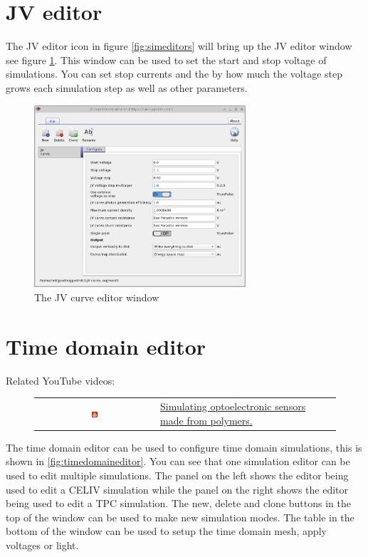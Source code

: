 \section{JV editor}
The JV editor icon in figure \ref{fig:simeditors} will bring up the JV editor window see figure \ref{fig:jvcurveeditor}. This window can be used to set the start and stop voltage of simulations. You can set stop currents and the by how much the voltage step grows each simulation step as well as other parameters.

\begin{figure}[H]
\centering
\includegraphics[width=0.7\textwidth,height=0.5\textwidth]{./images/jv_editor.png}
\caption{The JV curve editor window}
\label{fig:jvcurveeditor}
\end{figure}

\section{Time domain editor}
Related YouTube videos:
\begin{figure}[H]

\begin{tabular}{ c l }

\includegraphics[width=0.05\textwidth]{./images/youtube.png}

&
\href{https://www.youtube.com/watch?v=D7yJLFmTAVQ}{Simulating optoelectronic sensors made from polymers.}

\end{tabular}
\end{figure}

The time domain editor can be used to configure time domain simulations, this is shown in \ref{fig:timedomaineditor}.  You can see that one simulation editor can be used to edit multiple simulations.  The panel on the left shows the editor being used to edit a CELIV simulation while the panel on the right shows the editor being used to edit a TPC simulation.  The new, delete and clone buttons in the top of the window can be used to make new simulation modes. The table in the bottom of the window can be used to setup the time domain mesh, apply voltages or light.

